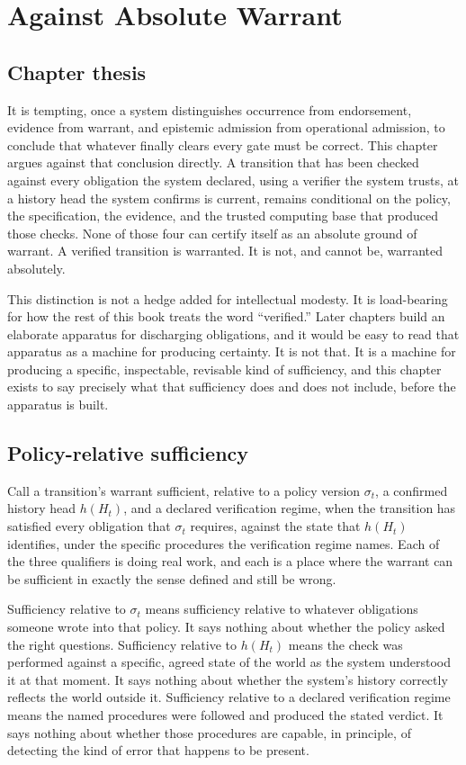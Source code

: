 \documentclass[11pt,openany]{book}
\begin{document}
\chapter{Against Absolute Warrant}
\section{Chapter thesis}

It is tempting, once a system distinguishes occurrence from endorsement,
evidence from warrant, and epistemic admission from operational admission, to
conclude that whatever finally clears every gate must be correct. This chapter
argues against that conclusion directly. A transition that has been checked
against every obligation the system declared, using a verifier the system
trusts, at a history head the system confirms is current, remains conditional
on the policy, the specification, the evidence, and the trusted computing base
that produced those checks. None of those four can certify itself as an
absolute ground of warrant. A verified transition is warranted. It is not, and
cannot be, warranted absolutely.

This distinction is not a hedge added for intellectual modesty. It is
load-bearing for how the rest of this book treats the word ``verified.'' Later
chapters build an elaborate apparatus for discharging obligations, and it
would be easy to read that apparatus as a machine for producing certainty. It
is not that. It is a machine for producing a specific, inspectable, revisable
kind of sufficiency, and this chapter exists to say precisely what that
sufficiency does and does not include, before the apparatus is built.

\section{Policy-relative sufficiency}

Call a transition's warrant sufficient, relative to a policy version
\(\sigma_t\), a confirmed history head \(h(H_t)\), and a declared verification
regime, when the transition has satisfied every obligation that \(\sigma_t\)
requires, against the state that \(h(H_t)\) identifies, under the specific
procedures the verification regime names. Each of the three qualifiers is
doing real work, and each is a place where the warrant can be sufficient in
exactly the sense defined and still be wrong.

Sufficiency relative to \(\sigma_t\) means sufficiency relative to whatever
obligations someone wrote into that policy. It says nothing about whether the
policy asked the right questions. Sufficiency relative to \(h(H_t)\) means the
check was performed against a specific, agreed state of the world as the
system understood it at that moment. It says nothing about whether the
system's history correctly reflects the world outside it. Sufficiency relative
to a declared verification regime means the named procedures were followed
and produced the stated verdict. It says nothing about whether those
procedures are capable, in principle, of detecting the kind of error that
happens to be present.
\end{document}
